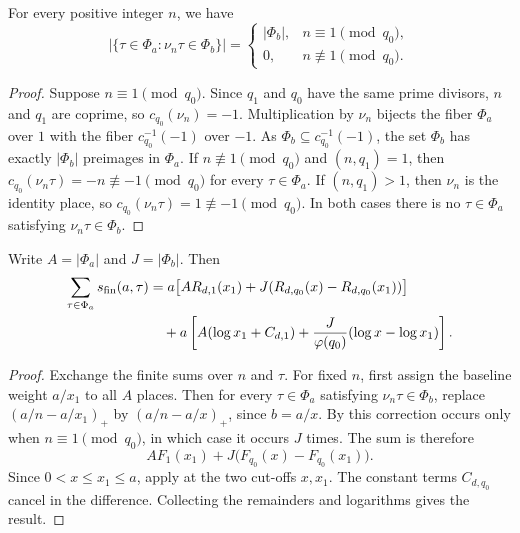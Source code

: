 \begin{lemma}
\label{lem:count-weighted-places}
\emitthmsource
For every positive integer $n$, we have
\[
 \bigl|\{\tau\in\Phi_a:\nu_n\tau\in\Phi_b\}\bigr|=
 \begin{cases}
 |\Phi_b|,&n\equiv1\pmod{q_0},\\
 0,&n\not\equiv1\pmod{q_0}.
 \end{cases}
\]
\end{lemma}
\begin{proof}
Suppose $n\equiv1\pmod{q_0}$. Since $q_1$ and $q_0$ have the same prime divisors, $n$ and $q_1$ are coprime, so $c_{q_0}(\nu_n)=-1$. Multiplication by $\nu_n$ bijects the fiber $\Phi_a$ over $1$ with the fiber $c_{q_0}^{-1}(-1)$ over $-1$. As $\Phi_b\subseteq c_{q_0}^{-1}(-1)$, the set $\Phi_b$ has exactly $|\Phi_b|$ preimages in $\Phi_a$.
If $n\not\equiv1\pmod{q_0}$ and $(n,q_1)=1$, then $c_{q_0}(\nu_n\tau)=-n\not\equiv-1\pmod{q_0}$ for every $\tau\in\Phi_a$. If $(n,q_1)>1$, then $\nu_n$ is the identity place, so $c_{q_0}(\nu_n\tau)=1\not\equiv-1\pmod{q_0}$. In both cases there is no $\tau\in\Phi_a$ satisfying $\nu_n\tau\in\Phi_b$.
\end{proof}

\begin{lemma}
\label{lem:sum-weighted-prime-sums}
\emitthmsource
Write $A=|\Phi_a|$ and $J=|\Phi_b|$. Then
\[
\begin{aligned}
 \sum_{\tau\in\Phi_a}s_{\rm fin}(a,\tau)
 &=a\bigl[A R_{d,1}(x_1)+J(R_{d,q_0}(x)-R_{d,q_0}(x_1))\bigr]\\
 &\quad+a\left[A(\log x_1+C_{d,1})
           +\frac{J}{\varphi(q_0)}(\log x-\log x_1)\right].
\end{aligned}
\]
\end{lemma}
\begin{proof}
Exchange the finite sums over $n$ and $\tau$. For fixed $n$, first assign the baseline weight $a/x_1$ to all $A$ places. Then for every $\tau\in\Phi_a$ satisfying $\nu_n\tau\in\Phi_b$, replace $(a/n-a/x_1)_+$ by $(a/n-a/x)_+$, since $b=a/x$. By  this correction occurs only when $n\equiv1\pmod{q_0}$, in which case it occurs $J$ times. The sum is therefore
\[
 A F_1(x_1)+J\bigl(F_{q_0}(x)-F_{q_0}(x_1)\bigr).
\]
Since $0<x\le x_1\le a$, apply  at the two cut-offs $x,x_1$. The constant terms $C_{d,q_0}$ cancel in the difference. Collecting the remainders and logarithms gives the result.
\end{proof}

